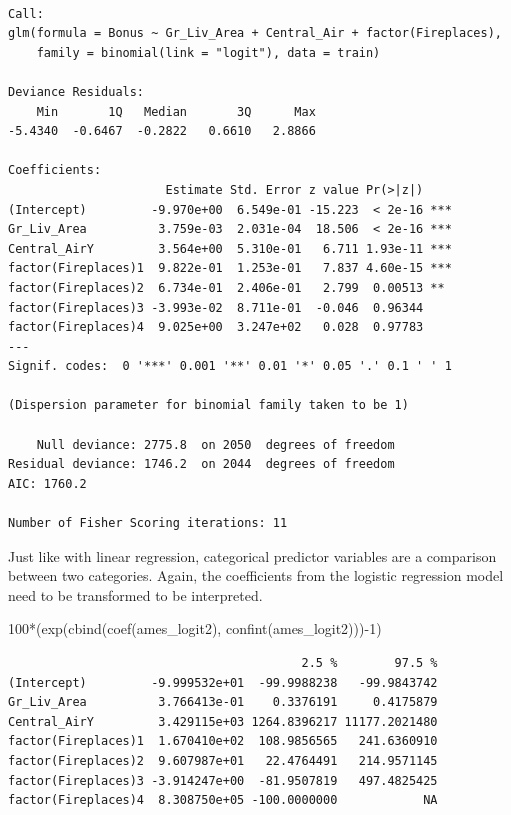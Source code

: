 \documentclass[
  letterpaper,
  DIV=11,
  numbers=noendperiod]{scrreprt}
\newenvironment{Shaded}{\begin{snugshade}}{\end{snugshade}}
\newcommand{\DecValTok}[1]{\textcolor[rgb]{0.68,0.00,0.00}{#1}}
\newcommand{\FunctionTok}[1]{\textcolor[rgb]{0.28,0.35,0.67}{#1}}
\newcommand{\NormalTok}[1]{\textcolor[rgb]{0.00,0.23,0.31}{#1}}
\newcommand{\SpecialCharTok}[1]{\textcolor[rgb]{0.37,0.37,0.37}{#1}}
\begin{document}
\begin{verbatim}

Call:
glm(formula = Bonus ~ Gr_Liv_Area + Central_Air + factor(Fireplaces), 
    family = binomial(link = "logit"), data = train)

Deviance Residuals: 
    Min       1Q   Median       3Q      Max  
-5.4340  -0.6467  -0.2822   0.6610   2.8866  

Coefficients:
                      Estimate Std. Error z value Pr(>|z|)    
(Intercept)         -9.970e+00  6.549e-01 -15.223  < 2e-16 ***
Gr_Liv_Area          3.759e-03  2.031e-04  18.506  < 2e-16 ***
Central_AirY         3.564e+00  5.310e-01   6.711 1.93e-11 ***
factor(Fireplaces)1  9.822e-01  1.253e-01   7.837 4.60e-15 ***
factor(Fireplaces)2  6.734e-01  2.406e-01   2.799  0.00513 ** 
factor(Fireplaces)3 -3.993e-02  8.711e-01  -0.046  0.96344    
factor(Fireplaces)4  9.025e+00  3.247e+02   0.028  0.97783    
---
Signif. codes:  0 '***' 0.001 '**' 0.01 '*' 0.05 '.' 0.1 ' ' 1

(Dispersion parameter for binomial family taken to be 1)

    Null deviance: 2775.8  on 2050  degrees of freedom
Residual deviance: 1746.2  on 2044  degrees of freedom
AIC: 1760.2

Number of Fisher Scoring iterations: 11
\end{verbatim}

Just like with linear regression, categorical predictor variables are a
comparison between two categories. Again, the coefficients from the
logistic regression model need to be transformed to be interpreted.

\begin{Shaded}
\begin{Highlighting}[]
\DecValTok{100}\SpecialCharTok{*}\NormalTok{(}\FunctionTok{exp}\NormalTok{(}\FunctionTok{cbind}\NormalTok{(}\FunctionTok{coef}\NormalTok{(ames\_logit2), }\FunctionTok{confint}\NormalTok{(ames\_logit2)))}\SpecialCharTok{{-}}\DecValTok{1}\NormalTok{)}
\end{Highlighting}
\end{Shaded}

\begin{verbatim}
                                         2.5 %        97.5 %
(Intercept)         -9.999532e+01  -99.9988238   -99.9843742
Gr_Liv_Area          3.766413e-01    0.3376191     0.4175879
Central_AirY         3.429115e+03 1264.8396217 11177.2021480
factor(Fireplaces)1  1.670410e+02  108.9856565   241.6360910
factor(Fireplaces)2  9.607987e+01   22.4764491   214.9571145
factor(Fireplaces)3 -3.914247e+00  -81.9507819   497.4825425
factor(Fireplaces)4  8.308750e+05 -100.0000000            NA
\end{verbatim}
\end{document}
